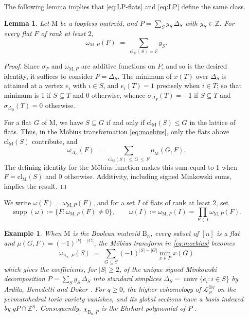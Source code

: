 \documentclass[11pt,a4paper,reqno]{amsart}
\theoremstyle{results}
\newtheorem{lemma}[thm]{Lemma}
\theoremstyle{definitions}
\newtheorem{example}[thm]{Example}
\def\Z{\mathbb{Z}}
\def\Z{\mathbb{Z}}
\newcommand{\abs}[1]{\left\lvert#1\right\rvert}
\newcommand{\B}{\textrm{B}}
\newcommand{\cl}{\textrm{cl}}
\newcommand{\M}{\mathrm{M}}
\DeclareMathOperator{\supp}{supp}
\newcommand{\cL}{\mathcal{L}}
\begin{document}
The following lemma implies that \eqref{eq:LP-flats} and \eqref{eq:LP} define the same class.
\begin{lemma}
  \label{lem:support-general}
  Let $\M$ be a loopless matroid, and $P = \sum_{S} y_S\,\Delta_S$ with $y_S \in \Z$. For every flat $F$ of rank at least $2$,
  \[
    \omega_{\M, P}(F) \;=\; \sum_{\cl_{\M}(S) = F} y_S .
  \]
\end{lemma}

\begin{proof}
  Since $\sigma_{P}$ and $\omega_{\M, P}$ are additive functions on $P$, and so
  is the desired identity, it suffices to consider $P = \Delta_S$.  The minimum of
  $x(T)$ over $\Delta_S$ is attained at a vertex $e_i$ with $i \in S$, and
  $e_i(T) = 1$ precisely when $i \in T$; so that minimum is $1$ if
  $S \subseteq T$ and $0$ otherwise, whence $\sigma_{\Delta_S}(T) = -1$ if
  $S \subseteq T$ and $\sigma_{\Delta_S}(T) = 0$ otherwise.

  For a flat $G$ of $\M$, we have $S \subseteq G$ if and only if
  $\cl_{\M}(S) \leqslant G$ in the lattice of flats. Thus, in the M\"{o}bius
  transformation \eqref{eq:moebius}, only the flats above $\cl_{\M}(S)$
  contribute, and
  \[
    \omega_{\Delta_S}(F) \;=\;
    \sum_{\cl_{\M}(S) \,\leqslant\, G \,\leqslant\, F} \mu_{\M}(G,F).
  \]
  The defining identity for the M\"obius function makes this sum equal to
  $1$ when $F=\cl_{\M}(S)$ and $0$ otherwise. Additivity, including signed
  Minkowski sums, implies the result.
\end{proof}

We write $\omega(F) = \omega_{\M, P}(F)$, and for a set $I$ of flats of rank at least $2$, set 
\[
\supp(\omega) \coloneqq  \{F : \omega_{\M, P}(F) \neq 0\}, \qquad \omega(I) \coloneqq \omega_{\M, P}(I) = \prod_{F \in I} \omega_{\M, P}(F). 
\] 


\begin{example}
When $\M$ is the Boolean matroid $\B_n$, every subset of $[n]$ is a flat and
$\mu(G,F) = (-1)^{\abs{F} - \abs{G}}$, the M\"obius transform in \eqref{eq:moebius} becomes
\[
  \omega_{\B_n, P}(S) \;=\; \sum_{G \subseteq S} (-1)^{\abs{S}-\abs{G}} \min_{x \in P} x(G)
\]
which gives the coefficients, for $|S|\geqslant2$, of the unique signed Minkowski decomposition $P = \sum_{S} y_S\, \Delta_S$
into standard simplices $\Delta_S = \operatorname{conv}\{e_i : i \in S\}$ by Ardila, Benedetti and Doker \cite[Proposition 2.4]{ardila2010matroid}.
For $q\geqslant0$, the higher cohomology of $\cL_P^{\otimes q}$ on the
permutohedral toric variety vanishes, and its global sections have a basis
indexed by $qP\cap\Z^n$. Consequently, $\chi_{\B_n,P}$ is the Ehrhart
polynomial of $P$ \cite[Section 9.4]{cox2011toric}.
\end{example}
\end{document}
